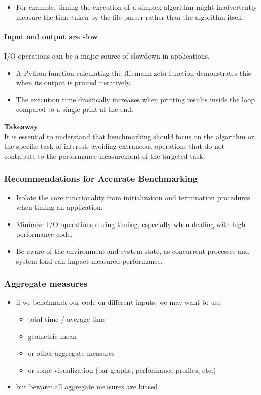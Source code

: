 \documentclass[12pt]{article}
\begin{document}
\begin{itemize}
    \item For example, timing the execution of a simplex algorithm might inadvertently measure the time taken by the file parser rather than the algorithm itself.
\end{itemize}

\paragraph{Input and output are slow}
I/O operations can be a major source of slowdown in applications.

\begin{itemize}
    \item A Python function calculating the Riemann zeta function demonstrates this when its output is printed iteratively.
    \item The execution time drastically increases when printing results inside the loop compared to a single print at the end.
\end{itemize}

\textbf{Takeaway}\\
It is essential to understand that benchmarking should focus on the algorithm or the specific task of interest, avoiding extraneous operations that do not contribute to the performance measurement of the targeted task.

\subsubsection{Recommendations for Accurate Benchmarking}
\begin{itemize}
    \item Isolate the core functionality from initialization and termination procedures when timing an application.
    \item Minimize I/O operations during timing, especially when dealing with high-performance code.
    \item Be aware of the environment and system state, as concurrent processes and system load can impact measured performance.
\end{itemize}
\subsubsection{Aggregate measures}

\begin{itemize}
    \item if we benchmark our code on different inputs, we may want to use
    \begin{itemize}
        \item total time / average time
        \item geometric mean
        \item or other aggregate measures
        \item or some visualization (bar graphs, performance profiles, etc.)
    \end{itemize}
    \item but beware: all aggregate measures are biased
\end{itemize}
\end{document}
